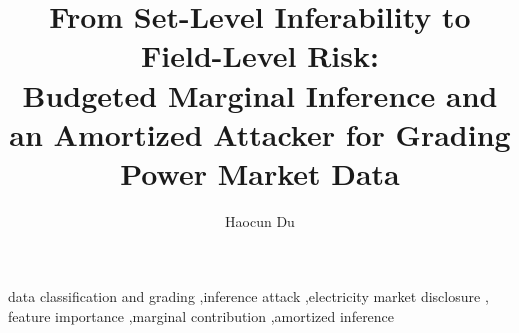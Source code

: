 \documentclass[preprint,12pt]{elsarticle}
\begin{document}
\begin{frontmatter}

\title{From Set-Level Inferability to Field-Level Risk:\\ Budgeted Marginal Inference and an Amortized
Attacker for Grading Power Market Data}

\author{Haocun Du}
\address{(affiliation to be completed)}



\begin{keyword}
data classification and grading \sep inference attack \sep electricity market disclosure \sep
feature importance \sep marginal contribution \sep amortized inference
\end{keyword}

\end{frontmatter}












\appendix

\clearpage



\end{document}
